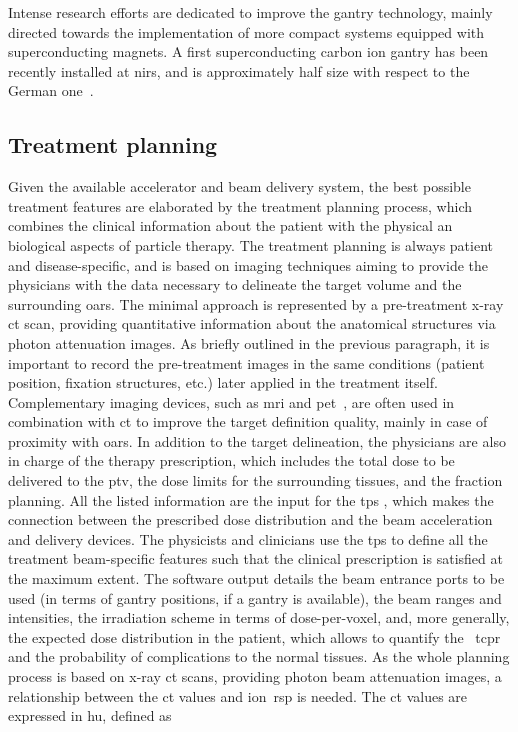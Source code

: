 Intense research efforts are dedicated to improve the gantry technology, mainly directed towards the implementation of more compact systems equipped with superconducting magnets. A first superconducting carbon ion gantry has been recently installed at \gls{nirs}, and is approximately half size with respect to the German one~\parencite{Iwata2013}.

\subsection{Treatment planning}\label{chap1::subsec::treatmentPlan}

Given the available accelerator and beam delivery system, the best possible treatment features are elaborated by the treatment planning process, which combines the clinical information about the patient with the physical an biological aspects of particle therapy. 
The treatment planning is always patient and disease-specific, and is based on imaging techniques aiming to provide the physicians with the data necessary to delineate the target volume and the surrounding \glspl{oar}. The minimal approach is represented by a pre-treatment x-ray \gls{ct} scan, providing quantitative information about the anatomical structures via photon attenuation images. As briefly outlined in the previous paragraph, it is important to record the pre-treatment images in the same conditions (patient position, fixation structures, etc.) later applied in the treatment itself. Complementary imaging devices, such as \gls{mri} and \gls{pet}~\parencite{Levy2007}, are often used in combination with \gls{ct} to improve the target definition quality, mainly in case of proximity with \glspl{oar}.
In addition to the target delineation, the physicians are also in charge of the therapy prescription, which includes the total dose to be delivered to the \gls{ptv}, the dose limits for the surrounding tissues, and the fraction planning.
All the listed information are the input for the \gls{tps} , which makes the connection between the prescribed dose distribution and the beam acceleration and delivery devices. The physicists and clinicians use the \gls{tps} to define all the treatment beam-specific features such that the clinical prescription is satisfied at the maximum extent. The software output details the beam entrance ports to be used (in terms of gantry positions, if a gantry is available), the beam ranges and intensities, the irradiation scheme in terms of dose-per-voxel, and, more generally, the expected dose distribution in the patient, which allows to quantify the ~\gls{tcpr} and the probability of complications to
the normal tissues.
As the whole planning process is based on x-ray \gls{ct} scans,   providing photon beam attenuation images, a relationship between the \gls{ct} values and ion~\gls{rsp} is needed. The \gls{ct} values are expressed in \gls{hu}, defined as

